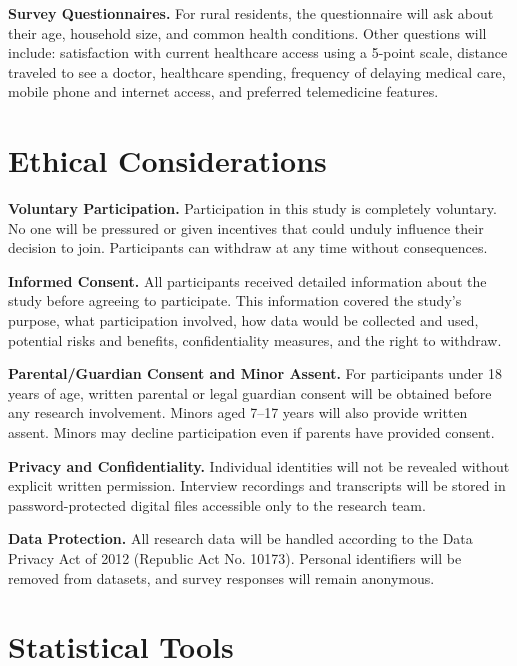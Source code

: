 \documentclass[12pt]{report}
\begin{document}
\noindent\textbf{Survey Questionnaires.} For rural residents, the questionnaire will ask
about their age, household size, and common health conditions. Other questions
will include: satisfaction with current healthcare access using a 5-point scale,
distance traveled to see a doctor, healthcare spending, frequency of delaying
medical care, mobile phone and internet access, and preferred telemedicine
features.

\section*{Ethical Considerations}

\noindent\textbf{Voluntary Participation.} Participation in this study is completely
voluntary. No one will be pressured or given incentives that could unduly
influence their decision to join. Participants can withdraw at any time without
consequences.

\noindent\textbf{Informed Consent.} All participants received detailed information about
the study before agreeing to participate. This information covered the study's
purpose, what participation involved, how data would be collected and used,
potential risks and benefits, confidentiality measures, and the right to
withdraw.

\noindent\textbf{Parental/Guardian Consent and Minor Assent.} For participants under 18
years of age, written parental or legal guardian consent will be obtained before
any research involvement. Minors aged 7--17 years will also provide written
assent. Minors may decline participation even if parents have provided consent.

\noindent\textbf{Privacy and Confidentiality.} Individual identities will not be
revealed without explicit written permission. Interview recordings and
transcripts will be stored in password-protected digital files accessible only
to the research team.

\noindent\textbf{Data Protection.} All research data will be handled according to the
Data Privacy Act of 2012 (Republic Act No. 10173). Personal identifiers will
be removed from datasets, and survey responses will remain anonymous.

\section*{Statistical Tools}
\end{document}
